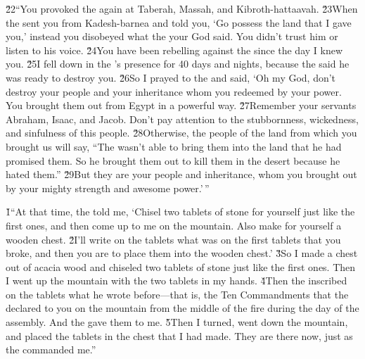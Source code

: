 \v{22}``You provoked the  again at Taberah, Massah, and Kibroth-hattaavah. \v{23}When the  sent you from Kadesh-barnea and told you, `Go possess the land that I gave you,' instead you disobeyed what the  your God said. You didn't trust him or listen to his voice. \v{24}You have been rebelling against the  since the day I knew you. \v{25}I fell down in the 's presence for 40 days and nights, because the  said he was ready to destroy you. \v{26}So I prayed to the  and said, `Oh  my God, don't destroy your people and your inheritance whom you redeemed by your power. You brought them out from Egypt in a powerful way. \v{27}Remember your servants Abraham, Isaac, and Jacob. Don't pay attention to the stubbornness, wickedness, and sinfulness of this people. \v{28}Otherwise, the people of the land from which you brought us will say, ``The  wasn't able to bring them into the land that he had promised them. So he brought them out to kill them in the desert because he hated them.'' \v{29}But they are your people and inheritance, whom you brought out by your mighty strength and awesome power.'\,''

\v{1}``At that time, the  told me, `Chisel two tablets of stone for yourself just like the first ones, and then come up to me on the mountain. Also make for yourself a wooden chest. \v{2}I'll write on the tablets what was on the first tablets that you broke, and then you are to place them into the wooden chest.' \v{3}So I made a chest out of acacia wood and chiseled two tablets of stone just like the first ones. Then I went up the mountain with the two tablets in my hands. \v{4}Then the  inscribed on the tablets what he wrote before---that is, the Ten Commandments that the  declared to you on the mountain from the middle of the fire during the day of the assembly. And the  gave them to me. \v{5}Then I turned, went down the mountain, and placed the tablets in the chest that I had made. They are there now, just as the  commanded me.''


